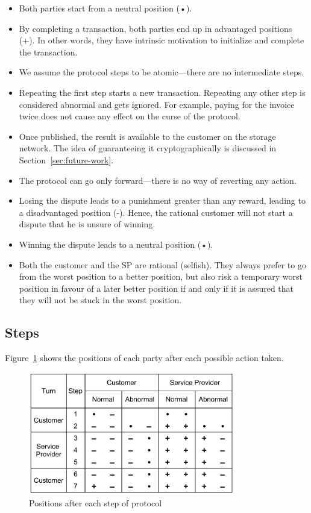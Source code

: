 \documentclass{ieeeaccess}
\begin{document}
\begin{itemize}

\item
  Both parties start from a neutral position (•).
\item
  By completing a transaction, both parties end up in advantaged positions (+). In other words, they have intrinsic motivation to initialize and complete the transaction.
\item
  We assume the protocol steps to be atomic—there are no intermediate steps.
\item
  Repeating the first step starts a new transaction. Repeating any other step is considered abnormal and gets ignored. For example, paying for the invoice twice does not cause any effect on the curse of the protocol.
\item Once published, the result is available to the customer on the storage network. The idea of guaranteeing it cryptographically is discussed in Section~\ref{sec:future-work}.
  
  
\item The protocol can go only forward—there is no way of reverting any action.
\item
  Losing the dispute leads to a punishment greater than any reward, leading to a disadvantaged position (-). Hence, the rational customer will not start a dispute that he is unsure of winning.
\item
  Winning the dispute leads to a neutral position (•).
\item
  Both the customer and the SP are rational (selfish). They always prefer to go from the worst position to a better position, but also risk a temporary worst position in favour of a later better position if and only if it is assured that they will not be stuck in the worst position.
\end{itemize}

\subsection{Steps}\label{steps}

Figure~\ref{fig:positions} shows the positions of each party after each possible action taken.

\begin{figure}[h!]
\includegraphics[width=9cm]{formal-table-of-positions.png}
\centering
\caption{Positions after each step of protocol}
\label{fig:positions}
\end{figure}
\end{document}
